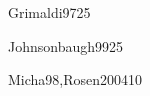 \begin{syllabus}
\begin{unit}{\DSFOURDef}{Grimaldi97}{25}
   \begin{topics}
	 \item 	\DSFOURTopicArgumentos
	 \item 	\DSFOURTopicPermutaciones
	 \item 	\DSFOURTopicPrincipio
	 \item 	\DSFOURTopicSolucion 
   \end{topics}

   \begin{unitgoals}
	\item \DSFOURObjONE
	\item \DSFOURObjTWO
	\item \DSFOURObjTHREE 
	\item \DSONEObjFOUR 
   \end{unitgoals}
\end{unit}

\begin{unit}{\DSCINCODef}{Johnsonbaugh99}{25}
   \begin{topics}
	 \item \DSCINCOTopicArboles
	 \item \DSCINCOTopicGrafos 
	 \item \DSCINCOTopicGrafosdirigidos
	 \item \DSCINCOTopicArbolesde 
	 \item \DSCINCOTopicEstrategias 
   \end{topics}

   \begin{unitgoals}
	 \item \DSCINCOObjONE
	 \item \DSCINCOObjTWO
	 \item \DSCINCOObjTHREE
	 \item \DSCINCOObjFOUR
   \end{unitgoals}
\end{unit}

\begin{unit}{\DSSEISDef}{Micha98,Rosen2004}{10}
   \begin{topics}
      \item \DSSEISTopicEspacios
      \item \DSSEISTopicProbabilidad 
      \item \DSSEISTopicVariables 
   \end{topics}

   \begin{unitgoals}
      \item \DSSEISObjONE
      \item \DSSEISObjTWO
      \item \DSSEISObjTHREE
      \item \DSSEISObjFOUR
   \end{unitgoals}
\end{unit}


\end{syllabus}
